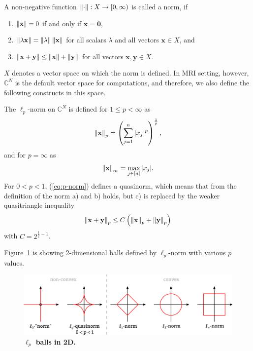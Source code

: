 \begin{tight_equations}

\begin{definition}[norm]
A non-negative function $\left\lVert\cdot\right\rVert: X \rightarrow [0, \infty)$ is called a norm, if 
\begin{enumerate}[label=\alph*)]
    \item $\left\lVert\mathbf{x}\right\rVert = 0$ if and only if $\mathbf{x} = \mathbf{0}$,
    \item $\left\lVert\lambda \mathbf{x}\right\rVert = \Vert \lambda \Vert \left\lVert\mathbf{x}\right\rVert$ for all scalars $\lambda$ and all vectors $\mathbf{x} \in X$, and
    \item $\left\lVert\mathbf{x} + \mathbf{y}\right\rVert \le \left\lVert\mathbf{x}\right\rVert + \left\lVert\mathbf{y}\right\rVert$ for all vectors $\mathbf{x, y} \in X$.
\end{enumerate}
\end{definition}

\begin{remark}
$X$ denotes a vector space on which the norm is defined. In MRI setting, however, $\mathbb{C}^N$ is the default vector space for computations, and therefore, we also define the following constructs in this space.
\end{remark}

\begin{definition}
The $\ell_p$-norm on $\mathbb{C}^N$ is defined for $1 \le p < \infty$ as
\begin{equation}\label{eq:p-norm}
\left\lVert\mathbf{x}\right\rVert_p = \left(\sum_{j=1}^n |x_j|^p\right)^{\frac{1}{p}},
\end{equation}
and for $p = \infty$ as
\[\left\lVert\mathbf{x}\right\rVert_\infty = \max_{j \in [n]} | x_j |.\]
For $0 < p < 1$, (\ref{eq:p-norm}) defines a quasinorm, which means that from the definition of the norm a) and b) holds, but c) is replaced by the weaker quasitriangle inequality
\[\left\lVert\mathbf{x} + \mathbf{y}\right\rVert_p \le C\left(\left\lVert\mathbf{x}\right\rVert_p + \left\lVert\mathbf{y}\right\rVert_p\right)\]
with $C = 2^{\frac{1}{2}-1}$.
\end{definition}

\begin{remark}
Figure~\ref{fig:balls} is showing 2-dimensional balls defined by $\ell_p$-norm with various $p$ values.
\end{remark}

\begin{figure}
    \centering
    \includegraphics[width=\textwidth]{images/balls.pdf}
    \caption{\textbf{$\ell_p$ balls in 2D.}}
    \label{fig:balls}
\end{figure}


\end{tight_equations}
